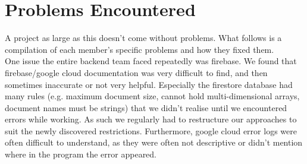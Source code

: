 \section{Problems Encountered}
A project as large as this doesn't come without problems. What follows is a compilation of each member's specific problems and how they fixed them. \\

One issue the entire backend team faced repeatedly was firebase. We found that firebase/google cloud documentation was very difficult to find, and then sometimes inaccurate or not very helpful.
Especially the firestore database had many rules (e.g. maximum document size, cannot hold multi-dimensional arrays, document names must be strings) that we didn't realise until we encountered errors while working. 
As such we regularly had to restructure our approaches to suit the newly discovered restrictions. 
Furthermore, google cloud error logs were often difficult to understand, as they were often not descriptive or didn't mention where in the program the error appeared. \\





